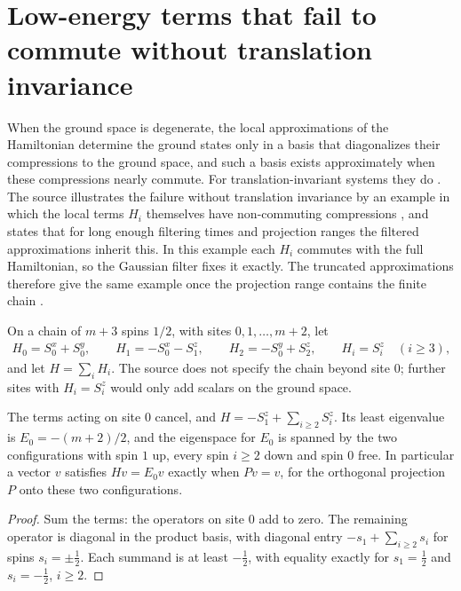 \section{Low-energy terms that fail to commute without translation invariance}
\label{sec:hastings_low_energy_example}


When the ground space is degenerate, the local approximations of the
Hamiltonian determine the ground states only in a basis that diagonalizes
their compressions to the ground space, and such a basis exists approximately
when these compressions nearly commute. For translation-invariant systems they
do \cite[lines 1603--1642]{Hastings2006Solving}. The source illustrates the
failure without translation invariance by an example in which the local terms
$H_i$ themselves have non-commuting compressions
\cite[lines 1655--1676]{Hastings2006Solving}, and states that for long enough
filtering times and projection ranges the filtered approximations inherit this.
In this example each $H_i$ commutes with the full Hamiltonian, so the Gaussian
filter fixes it exactly. The truncated approximations therefore give the same
example once the projection range contains the finite chain
\cite{gap:hastings05_low_energy_example}.

On a chain of $m+3$ spins $1/2$, with sites $0,1,\ldots,m+2$, let
\begin{align}
    H_0=S^x_0+S^y_0,\qquad
    H_1=-S^x_0-S^z_1,\qquad
    H_2=-S^y_0+S^z_2,\qquad
    H_i=S^z_i\quad(i\ge3),
\end{align}
and let $H=\sum_iH_i$. The source does not specify the chain beyond site $0$;
further sites with $H_i=S^z_i$ would only add scalars on the ground space.

\begin{lemma}
    \label{thm:hastings_low_energy_example_hamiltonian}
    \leanok
    The terms acting on site $0$ cancel, and
    $H=-S^z_1+\sum_{i\ge2}S^z_i$. Its least eigenvalue is
    $E_0=-(m+2)/2$, and the eigenspace for $E_0$ is spanned by the two
    configurations with spin $1$ up, every spin $i\ge2$ down and spin $0$
    free. In particular a vector $v$ satisfies $Hv=E_0v$ exactly when
    $Pv=v$, for the orthogonal projection $P$ onto these two
    configurations.
\end{lemma}
\begin{proof}\leanok
    Sum the terms: the operators on site $0$ add to zero. The remaining
    operator is diagonal in the product basis, with diagonal entry
    $-s_1+\sum_{i\ge2}s_i$ for spins $s_i=\pm\tfrac12$. Each summand is at
    least $-\tfrac12$, with equality exactly for $s_1=\tfrac12$ and
    $s_i=-\tfrac12$, $i\ge2$.
\end{proof}

